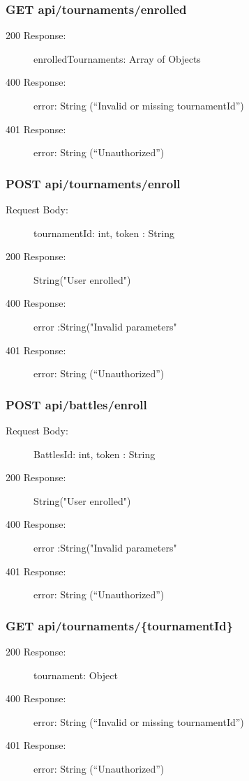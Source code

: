 \documentclass{Configuration_Files/Template}
\begin{document}
\subsubsection{GET api/tournaments/enrolled}
\begin{description}
    \item[200 Response:] enrolledTournaments: Array of Objects
    \item[400 Response:] error: String (“Invalid or missing tournamentId”)
    \item[401 Response:] error: String (“Unauthorized”)
\end{description}

\subsubsection{POST api/tournaments/enroll}
\begin{description}
    \item[Request Body:] tournamentId: int, token : String
    \item[200 Response:] String("User enrolled")
    \item[400 Response:] error :String("Invalid parameters"
    \item[401 Response:] error: String (“Unauthorized”)
\end{description}

\subsubsection{POST api/battles/enroll}
\begin{description}
    \item[Request Body:] BattlesId: int, token : String
    \item[200 Response:] String("User enrolled")
    \item[400 Response:] error :String("Invalid parameters"
    \item[401 Response:] error: String (“Unauthorized”)
\end{description}


\subsubsection{GET api/tournaments/\{tournamentId\}}
\begin{description}
    \item[200 Response:] tournament: Object
    \item[400 Response:] error: String (“Invalid or missing tournamentId”)
    \item[401 Response:] error: String (“Unauthorized”)
\end{description}
\end{document}
